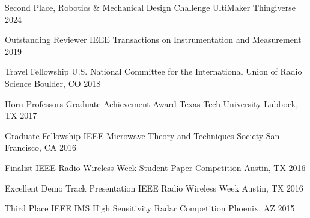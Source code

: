 
\begin{cvhonors}

    \cvhonor
        {Second Place, Robotics \& Mechanical Design Challenge}
        {UltiMaker Thingiverse}
        {}
        {2024}

    \cvhonor
        {Outstanding Reviewer}
        {IEEE Transactions on Instrumentation and Measurement}
        {}
        {2019}

    \cvhonor
        {Travel Fellowship}
        {U.S. National Committee for the International Union of Radio Science}
        {Boulder, CO}
        {2018}

    \cvhonor
        {Horn Professors Graduate Achievement Award}
        {Texas Tech University}
        {Lubbock, TX}
        {2017}

    \cvhonor
        {Graduate Fellowship}
        {IEEE Microwave Theory and Techniques Society}
        {San Francisco, CA}
        {2016}

    \cvhonor
        {Finalist}
        {IEEE Radio Wireless Week Student Paper Competition}
        {Austin, TX}
        {2016}

    \cvhonor
        {Excellent Demo Track Presentation}
        {IEEE Radio Wireless Week}
        {Austin, TX}
        {2016}

    \cvhonor
        {Third Place}
        {IEEE IMS High Sensitivity Radar Competition}
        {Phoenix, AZ}
        {2015}

\end{cvhonors}
